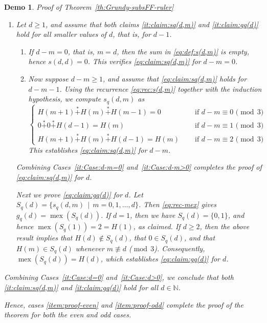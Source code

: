 \documentclass[10pt,a4paper]{amsart}
\newtheorem{demo}{Demo}
\def\MOD{\operatorname{mod}}
\def\Non{\mathbb{N}}
\newcommand{\mex}{\operatorname{mex}}
\newcommand{\nimadd}{\overset{*}{+}}
\begin{document}
\begin{demo}{Proof of Theorem~\ref{th:Grundy-subsFF-ruler}}
\begin{enumerate}[leftmargin=14pt,label=(\roman*)]
\begin{enumerate}[label=\Roman*)]
%
Moreover, $g_{q}(0)=\mex\{s_{q}(0,0)\}=1$.
Therefore, both claims \ref{it:claim:sq(d,m)} and \ref{it:claim:gq(d)} hold for $d=0$.
%
%
\item\label{it:Case:d>0}
%
Let $d\geq1$,
and assume that both claims \ref{it:claim:sq(d,m)} and \ref{it:claim:gq(d)} 
hold for all smaller values of $d$, that is, for $d-1$.
%
\begin{enumerate}[label=\roman*)]
%
\item\label{it:Case:d-m=0}
%
If $d-m=0$, that is, $m=d$, then the sum in \eqref{eq:def:s(d,m)} is empty, hence $s(d,d)=0$.
This verifies \eqref{eq:claim:sq(d,m)} for $d-m=0$.
%
\item\label{it:Case:d-m>0}
%
Now suppose $d-m\geq1$, and assume that \eqref{eq:claim:sq(d,m)} holds for $d-m-1$.
%
Using the recurrence \eqref{eq:rec:s(d,m)} together with the induction hypothesis,
we compute $s_{q}(d,m)$ as
%
\begin{equation*}
\begin{cases}
H(m+1)\nimadd H(m)\nimadd H(m-1)=0\quad&\text{ if $d-m \equiv 0$ ($\MOD\,3$)}\\
0\nimadd 0\nimadd H(d-1)=H(m)\quad&\text{ if $d-m \equiv 1$ ($\MOD\,3$)}\\
H(m+1)\nimadd H(m)\nimadd H(d-1)=H(m)\quad&\text{ if $d-m \equiv 2$ ($\MOD\,3$)}
\end{cases}
\end{equation*}
%
This establishes \eqref{eq:claim:sq(d,m)} for $d-m$.
%
\end{enumerate}
%
Combining Cases~\ref{it:Case:d-m=0} and~\ref{it:Case:d-m>0} completes the proof of \eqref{eq:claim:sq(d,m)} for $d$.
%
\par
%
Next we prove \eqref{eq:claim:gq(d)} for $d$.
%
Let $S_{q}(d)=\{s_{q}(d,m)\,\mid\,m=0,1,\dots,d\}$.
Then \eqref{eq:rec-mex} gives $g_{q}(d)=\mex(S_{q}(d))$.
%
If $d=1$, then we have $S_{q}(d)=\{0,1\}$, and hence $\mex(S_{q}(1))=2=H(1)$, as claimed.
%
If $d\geq2$, then the above result implies that $H(d)\not\in S_{q}(d)$,
that $0\in S_{q}(d)$, 
and that $H(m)\in S_{q}(d)$ whenever $m\not\equiv d$ ($\MOD\,3$).
%
Consequently, $\mex(S_{q}(d))=H(d)$, which establishes \eqref{eq:claim:gq(d)} for $d$.
%
\end{enumerate}
%
Combining Cases~\ref{it:Case:d=0} and~\ref{it:Case:d>0},
we conclude that both \ref{it:claim:sq(d,m)} and \ref{it:claim:gq(d)} hold for all $d\in\Non$.
%
\end{enumerate} %
%
Hence, cases \ref{item:proof-even} and \ref{item:proof-odd} complete 
the proof of the theorem for both the even and odd cases.
%
\end{demo}
\end{document}
